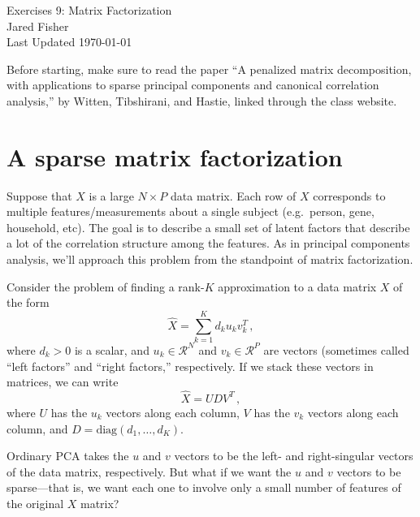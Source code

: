 \documentclass{article}
\begin{document}
\large 
\begin{center}
Exercises 9: Matrix Factorization\\
\vspace{10pt}
Jared Fisher\\
Last Updated \today
\end{center}
\normalsize

\bigskip

Before starting, make sure to read the paper ``A penalized matrix decomposition, with applications to sparse principal components and canonical correlation analysis,'' by Witten, Tibshirani, and Hastie, linked through the class website.

\section{A sparse matrix factorization}

Suppose that $X$ is a large $N \times P$ data matrix.  Each row of $X$ corresponds to multiple features/measurements about a single subject (e.g.~person, gene, household, etc).  The goal is to describe a small set of latent factors that describe a lot of the correlation structure among the features.  As in principal components analysis, we'll approach this problem from the standpoint of matrix factorization.

Consider the problem of finding a rank-$K$ approximation to a data matrix $X$ of the form
$$
\hat{X} = \sum_{k=1}^K d_k u_k v_k^T \, ,
$$
where $d_k > 0$ is a scalar, and $u_k \in \mathcal{R}^N$ and $v_k \in \mathcal{R}^P$ are vectors (sometimes called ``left factors'' and ``right factors,'' respectively.  If we stack these vectors in matrices, we can write
$$
\hat{X} = U D V^T \, ,
$$
where $U$ has the $u_k$ vectors along each column, $V$ has the $v_k$ vectors along each column, and $D = \mbox{diag}(d_1, \ldots, d_K)$. 

Ordinary PCA takes the $u$ and $v$ vectors to be the left- and right-singular vectors of the data matrix, respectively.  But what if we want the $u$ and $v$ vectors to be sparse---that is, we want each one to involve only a small number of features of the original $X$ matrix?
\end{document}
